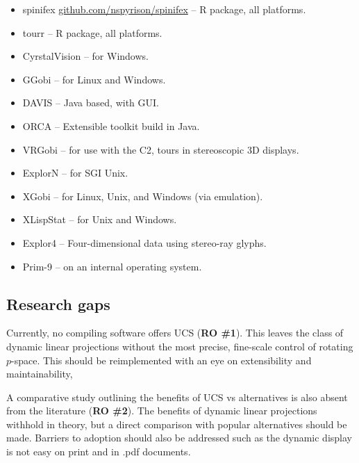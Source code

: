 \documentclass{monashthesis}
\begin{document}
\begin{itemize}
\tightlist
\item
  spinifex
  \href{https://github.com/nspyrison/spinifex}{github.com/nspyrison/spinifex}
  -- R package, all platforms.
\item
  tourr \autocite{wickham_tourr_2011} -- R package, all platforms.
\item
  CyrstalVision \autocite{wegman_visual_2003} -- for Windows.
\item
  GGobi \autocite{swayne_ggobi:_2003} -- for Linux and Windows.
\item
  DAVIS \autocite{huh_davis:_2002} -- Java based, with GUI.
\item
  ORCA \autocite{sutherland_orca:_2000} -- Extensible toolkit build in
  Java.
\item
  VRGobi \autocite{nelson_xgobi_1998} -- for use with the C2, tours in
  stereoscopic 3D displays.
\item
  ExplorN \autocite{carr_explorn:_1996} -- for SGI Unix.
\item
  XGobi \autocite{swayne_xgobi:_1991} -- for Linux, Unix, and Windows
  (via emulation).
\item
  XLispStat \autocite{tierney_lisp-stat:_1990} -- for Unix and Windows.
\item
  Explor4 \autocite{carr_explor4:_1988} -- Four-dimensional data using
  stereo-ray glyphs.
\item
  Prim-9 \autocites{asimov_grand_1985}{fisherkeller_prim-9:_1974} -- on
  an internal operating system.
\end{itemize}

\subsection{Research gaps}\label{research-gaps}

Currently, no compiling software offers UCS (\textbf{RO \#1}). This
leaves the class of dynamic linear projections without the most precise,
fine-scale control of rotating \(p\)-space. This should be reimplemented
with an eye on extensibility and maintainability,

A comparative study outlining the benefits of UCS vs alternatives is
also absent from the literature (\textbf{RO \#2}). The benefits of
dynamic linear projections withhold in theory, but a direct comparison
with popular alternatives should be made. Barriers to adoption should
also be addressed such as the dynamic display is not easy on print and
in .pdf documents.
\end{document}
